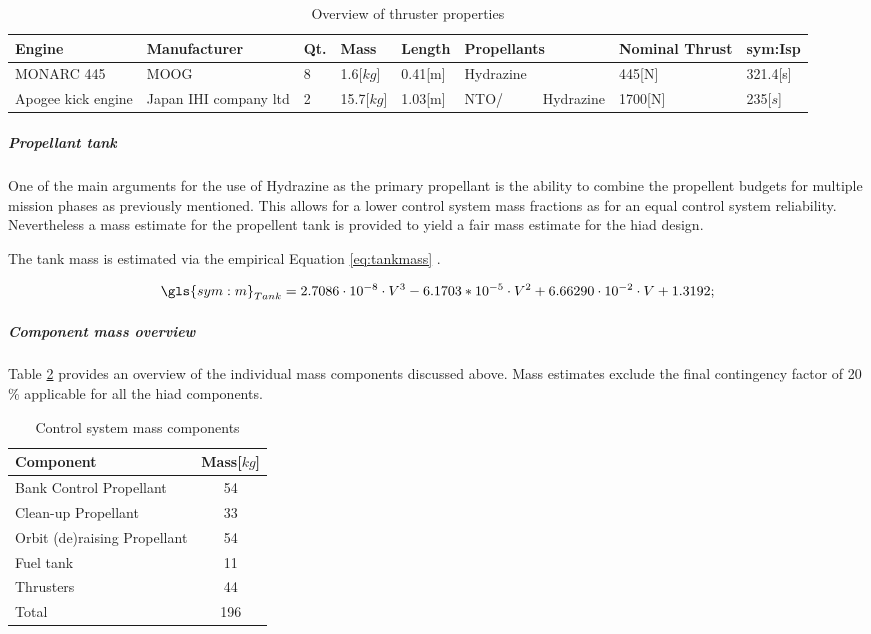 \begin{table}[H]
\caption{Overview of thruster properties}
\label{tab:thrusters}
\hspace{-5mm}
\begin{tabular}{|p{}|p{}|l|l|l|p{}|p{}|l|} \hline 
\textbf{Engine    }          &\textbf{ Manufacturer }         & \textbf{Qt.} &\textbf{ Mass }      & \textbf{Length } & \textbf{Propellants }  & \textbf{Nominal Thrust} & \textbf{\gls{sym:Isp}} \\ \hline \hline
MONARC 445          & MOOG                  & 8        & 1.6[$kg$]  & 0.41[m] & Hydrazine     & 445[N]         & 321.4[s]      \\ \hline
Apogee kick engine & Japan IHI company ltd & 2        & 15.7[$kg$] & 1.03[m] & NTO/~~~~~ Hydrazine & 1700[N]        & 235[$s$]     \\ \hline
\end{tabular}
\end{table}


\subparagraph{Propellant tank}

One of the main arguments for the use of Hydrazine as the primary propellant is the ability to combine the propellent budgets for multiple mission phases as previously mentioned. This allows for a lower control system mass fractions as for an equal control system reliability. Nevertheless a mass estimate for the propellent tank is provided to yield a fair mass estimate for the \gls{hiad} design. 

The tank mass is estimated via the empirical Equation \ref{eq:tankmass} \cite[p. 543]{Wertz2011}.

\begin{equation}
\label{eq:tankmass} 
\gls{sym:m}_{Tank}=2.7086 \cdot 10^{-8} \cdot V^3 -6.1703*10^{-5} \cdot V^2 +6.66290 \cdot 10^{-2}  \cdot V +1.3192;
\end{equation}

\subparagraph{Component mass overview}

Table \ref{tab:controlmassbreakdown} provides an overview of the individual mass components discussed above. Mass estimates exclude the final contingency factor of 20 \% applicable for all the \gls{hiad} components.

\begin{table}[h]
\centering
\caption{Control system mass components}
\label{tab:controlmassbreakdown}
\begin{tabular}{|l|c|} \hline
\textbf{Component}                 & \textbf{Mass[$kg$]} \\ \hline
Bank Control Propellant      &     54       \\ \hline
Clean-up Propellant          &     33       \\ \hline
Orbit (de)raising Propellant &     54       \\ \hline
Fuel tank              		 &     11      \\ \hline
Thrusters                	 &     44     \\ \hline \hline
Total                        &     196      \\ \hline
\end{tabular}
\end{table}

